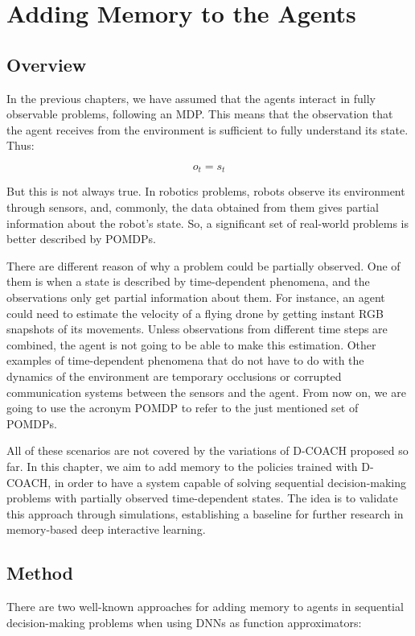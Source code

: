 \chapter{Adding Memory to the Agents}
\section{Overview}
In the previous chapters, we have assumed that the agents interact in fully observable problems, following an MDP. This means that the observation that the agent receives from the environment is sufficient to fully understand its state. Thus:

\begin{equation}
    o_{t} = s_{t}
\end{equation}

But this is not always true. In robotics problems, robots observe its environment through sensors, and, commonly, the data obtained from them gives partial information about the robot's state. So, a significant set of real-world problems is better described by POMDPs.

There are different reason of why a problem could be partially observed. One of them is when a state is described by time-dependent phenomena, and the observations only get partial information about them. For instance, an agent could need to estimate the velocity of a flying drone by getting instant RGB snapshots of its movements. Unless observations from different time steps are combined, the agent is not going to be able to make this estimation. Other examples of time-dependent phenomena that do not have to do with the dynamics of the environment are temporary occlusions or corrupted communication systems between the sensors and the agent. From now on, we are going to use the acronym POMDP to refer to the just mentioned set of POMDPs.

All of these scenarios are not covered by the variations of D-COACH proposed so far. In this chapter, we aim to add memory to the policies trained with D-COACH, in order to have a system capable of solving sequential decision-making problems with partially observed time-dependent states. The idea is to validate this approach through simulations, establishing a baseline for further research in memory-based deep interactive learning.

\section{Method}
There are two well-known approaches for adding memory to agents in sequential decision-making problems when using DNNs as function approximators:

